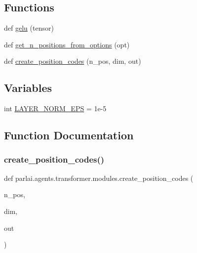 \subsection*{Functions}
\begin{DoxyCompactItemize}
\item 
def \hyperlink{namespaceparlai_1_1agents_1_1transformer_1_1modules_ad93916b8d2188c35733089e1581c44f8}{gelu} (tensor)
\item 
def \hyperlink{namespaceparlai_1_1agents_1_1transformer_1_1modules_ab67607512c597ddd54f2b60a1a1eaf4c}{get\+\_\+n\+\_\+positions\+\_\+from\+\_\+options} (opt)
\item 
def \hyperlink{namespaceparlai_1_1agents_1_1transformer_1_1modules_a0b86437e6e9682fa3100e9cadcaae259}{create\+\_\+position\+\_\+codes} (n\+\_\+pos, dim, out)
\end{DoxyCompactItemize}
\subsection*{Variables}
\begin{DoxyCompactItemize}
\item 
int \hyperlink{namespaceparlai_1_1agents_1_1transformer_1_1modules_afb85e0862dd867aee20a92e26aa29f58}{L\+A\+Y\+E\+R\+\_\+\+N\+O\+R\+M\+\_\+\+E\+PS} = 1e-\/5
\end{DoxyCompactItemize}


\subsection{Function Documentation}
\mbox{\label{namespaceparlai_1_1agents_1_1transformer_1_1modules_a0b86437e6e9682fa3100e9cadcaae259}} 
\subsubsection{\texorpdfstring{create\+\_\+position\+\_\+codes()}{create\_position\_codes()}}
{\footnotesize\ttfamily def parlai.\+agents.\+transformer.\+modules.\+create\+\_\+position\+\_\+codes (\begin{DoxyParamCaption}\item[{}]{n\+\_\+pos,  }\item[{}]{dim,  }\item[{}]{out }\end{DoxyParamCaption})}

